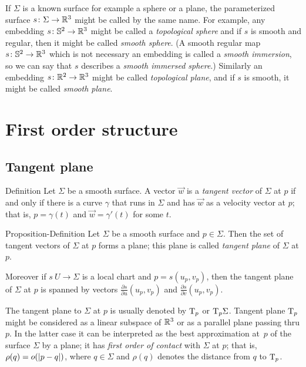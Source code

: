 If $\Sigma$ is a known surface for example a sphere or a plane, the parameterized surface $s\colon\Sigma\to\mathbb{R}^3$ might be called by the same name.
For example, any embedding $s\colon\mathbb{S}^2\to\mathbb{R}^3$ might be called a \emph{topological sphere}
and if $s$ is smooth and regular, then it might be called \emph{smooth sphere}.
(A smooth regular map $s\colon\mathbb{S}^2\to\mathbb{R}^3$ which is not necessary an embedding is called a \emph{smooth immersion}, so we can say that $s$ describes a \emph{smooth immersed sphere}.) 
Similarly an embedding $s\colon\mathbb{R}^2\to\mathbb{R}^3$ might be called \emph{topological plane},
and if $s$ is smooth, it might be called \emph{smooth plane}.

\chapter{First order structure}

\section*{Tangent plane}

\begin{thm}{Definition}
Let $\Sigma$ be a smooth surface.
A vector $\vec w$ is a \emph{tangent vector} of $\Sigma$ at $p$ if and only if there is a curve $\gamma$ that runs in $\Sigma$ and has $\vec w$ as a velocity vector at $p$;
that is, $p=\gamma(t)$ and $\vec w=\gamma'(t)$ for some $t$.
\end{thm}

\begin{thm}{Proposition-Definition}
Let $\Sigma$ be a smooth surface and $p\in \Sigma$.
Then the set of tangent vectors of $\Sigma$ at $p$ forms a plane;
this plane is called \emph{tangent plane} of $\Sigma$ at $p$.

Moreover if $s\:U\to \Sigma$ is a local chart and $p=s(u_p,v_p)$, then 
the tangent plane of $\Sigma$ at $p$ is spanned by vectors $\tfrac{\partial s}{\partial u}(u_p,v_p)$ and $\tfrac{\partial s}{\partial v}(u_p,v_p)$.
\end{thm}

The tangent plane to $\Sigma$ at $p$ is usually denoted by $\mathrm{T}_p$ or $\mathrm{T}_p\Sigma$.
Tangent plane $\mathrm{T}_p$ might be considered as a linear subspace of $\mathbb{R}^3$ or as a parallel plane passing thru $p$.
In the latter case it can be interpreted as the best approximation at~$p$ of the surface $\Sigma$ by a plane;
it has \emph{first order of contact} with $\Sigma$ at $p$;
that is, $\rho(q)\z=o(|p-q|)$, where $q\in \Sigma$ and $\rho(q)$ denotes the distance from $q$ to $\mathrm{T}_p$.

